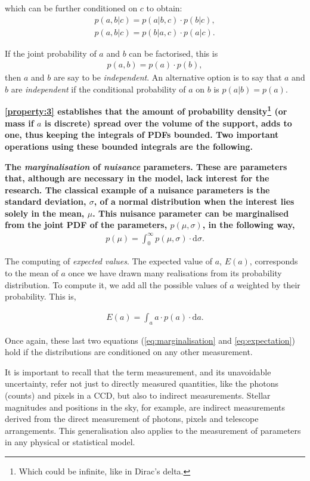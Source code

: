 which can be further conditioned on $c$ to obtain:
\begin{align}
\label{eq:conditioned}
p(a,b|c)=p(a|b,c)\cdot p(b|c),\nonumber \\
p(a,b|c)=p(b|a,c) \cdot p(a|c).
\end{align}

If the joint probability of $a$ and $b$ can be factorised, this is
\begin{align}
p(a,b)=p(a)\cdot p(b),
\end{align}
then $a$ and $b$ are say to be \emph{independent}. An alternative option is to say that $a$ and $b$ are \emph{independent} if the conditional probability of $a$ on $b$ is $p(a|b)=p(a)$.

\textbf{
\ref{property:3} establishes that the amount of probability density\footnote{Which could be infinite, like in Dirac's delta.} (or mass if $a$ is discrete) spread over the volume of the support, adds to one, thus keeping the integrals of PDFs bounded. Two important operations using these bounded integrals are the following.
}

\textbf{
The \emph{marginalisation} of \emph{nuisance} parameters. These are parameters that, although are necessary in the model, lack interest for the research. The classical example of a nuisance parameters is the standard deviation, $\sigma$, of a normal distribution when the interest lies solely in the mean, $\mu$. This nuisance parameter can be marginalised from the joint PDF of the parameters, $p(\mu,\sigma)$, in the following way,
}
\begin{align}
\label{eq:marginalisation}
p(\mu)=\int_0^{\infty} p(\mu,\sigma)\cdot \mathrm{d}\sigma.
\end{align}

The computing of \emph{expected values}. The expected value of $a$, $E(a)$, corresponds to the mean of $a$ once we have drawn many realisations from its probability distribution. To compute it, we add all the possible values of $a$ weighted by their probability. This is,

\begin{align}
\label{eq:expectation}
E(a)=\int_a a\cdot p(a)\cdot \mathrm{d}a.
\end{align}

Once again, these last two equations (\ref{eq:marginalisation} and \ref{eq:expectation}) hold if the distributions are conditioned on any other measurement.

It is important to recall that the term measurement, and its unavoidable uncertainty, refer not just to directly measured quantities, like the photons (counts) and pixels in a CCD, but also to indirect measurements. Stellar magnitudes and positions in the sky, for example, are indirect measurements derived from the direct measurement of photons, pixels and telescope arrangements. This generalisation also applies to the measurement of parameters in any physical or statistical model.%

